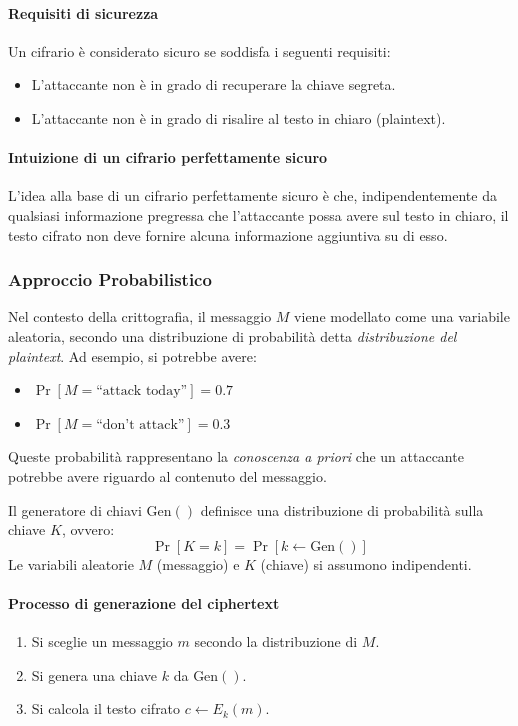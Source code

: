 \documentclass{article}
\begin{document}
            \paragraph{Requisiti di sicurezza}
                Un cifrario è considerato sicuro se soddisfa i seguenti requisiti:
            \begin{itemize}
                \item L'attaccante non è in grado di recuperare la chiave segreta.
                \item L'attaccante non è in grado di risalire al testo in chiaro (plaintext).
                \end{itemize}

            \paragraph{Intuizione di un cifrario perfettamente sicuro}
                L'idea alla base di un cifrario perfettamente sicuro è che, indipendentemente da qualsiasi informazione pregressa che l'attaccante possa avere sul testo in chiaro, il testo cifrato non deve fornire alcuna informazione aggiuntiva su di esso.
  \subsubsection{Approccio Probabilistico}
   Nel contesto della crittografia, il messaggio $M$ viene modellato come una variabile aleatoria, secondo una distribuzione di probabilità detta \textit{distribuzione del plaintext}. Ad esempio, si potrebbe avere:

  \begin{itemize}
      \item $\Pr[M = \text{``attack today''}] = 0.7$
      \item $\Pr[M = \text{``don't attack''}] = 0.3$
  \end{itemize}
  
  Queste probabilità rappresentano la \textit{conoscenza a priori} che un attaccante potrebbe avere riguardo al contenuto del messaggio.
  
  Il generatore di chiavi $\text{Gen}()$ definisce una distribuzione di probabilità sulla chiave $K$, ovvero:
  \[
  \Pr[K = k] = \Pr[k \leftarrow \text{Gen}()]
  \]
  Le variabili aleatorie $M$ (messaggio) e $K$ (chiave) si assumono indipendenti.
  
  \paragraph{Processo di generazione del ciphertext}
  \begin{enumerate}
      \item Si sceglie un messaggio $m$ secondo la distribuzione di $M$.
      \item Si genera una chiave $k$ da $\text{Gen}()$.
      \item Si calcola il testo cifrato $c \leftarrow E_k(m)$.
  \end{enumerate}
  
\end{document}
